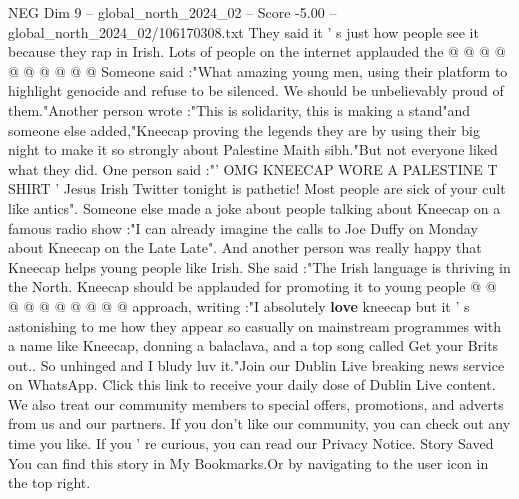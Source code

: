 \begin{textsample}{NEG Dim 9 – global\_north\_2024\_02 – Score -5.00 – global\_north\_2024\_02/106170308.txt}
They said it ' s just how people see it because they rap in Irish.
Lots of people on the internet applauded the @ @ @ @ @ @ @ @ @ @ Someone said :"What amazing young men, using their platform to highlight genocide and refuse to be silenced.
We should be unbelievably proud of them."Another person wrote :"This is solidarity, this is making a stand"and someone else added,"Kneecap proving the legends they are by using their big night to make it so strongly about Palestine Maith sibh."But not everyone liked what they did.
One person said :"' OMG KNEECAP WORE A PALESTINE T SHIRT ' Jesus Irish Twitter tonight is pathetic!
Most people are sick of your cult like antics".
Someone else made a joke about people talking about Kneecap on a famous radio show :"I can already imagine the calls to Joe Duffy on Monday about Kneecap on the Late Late".
And another person was really happy that Kneecap helps young people like Irish.
She said :"The Irish language is thriving in the North.
Kneecap should be applauded for promoting it to young people @ @ @ @ @ @ @ @ @ @ approach, writing :"I absolutely \textbf{love} kneecap but it ' s astonishing to me how they appear so casually on mainstream programmes with a name like Kneecap, donning a balaclava, and a top song called Get your Brits out..
So unhinged and I bludy luv it."Join our Dublin Live breaking news service on WhatsApp.
Click this link to receive your daily dose of Dublin Live content.
We also treat our community members to special offers, promotions, and adverts from us and our partners.
If you don't like our community, you can check out any time you like.
If you ' re curious, you can read our Privacy Notice.
Story Saved You can find this story in My Bookmarks.Or by navigating to the user icon in the top right.

\end{textsample}
